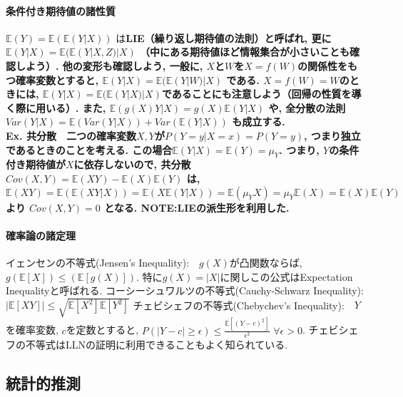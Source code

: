 \documentclass[paper=a4paper,fontsize=10pt]{jlreq}
\begin{document}
\paragraph{条件付き期待値の諸性質}
$\mathbb{E}(Y)=\mathbb{E}(\mathbb{E}(Y|X))$ は\rmfamily\mcfamily\bfseries{LIE（繰り返し期待値の法則）}\mdseries と呼ばれ, 更に $\mathbb{E}(Y|X)=\mathbb{E}(\mathbb{E}(Y|X, Z)|X)$ （中にある期待値ほど情報集合が小さいことも確認しよう）. 他の変形も確認しよう, 一般に, $X$と$W$を$X=f(W)$の関係性をもつ確率変数とすると, $\mathbb{E}(Y|X)=\mathbb{E}(\mathbb{E}(Y|W)|X)$ である. $X=f(W)=W$のときには, $\mathbb{E}(Y|X)=\mathbb{E}(\mathbb{E}(Y|X)|X)$であることにも注意しよう（回帰の性質を導く際に用いる）. また, $\mathbb{E}(g(X)Y|X)=g(X)\mathbb{E}(Y|X)$ や, 全分散の法則 $Var(Y|X)=\mathbb{E}(Var(Y|X))+Var(\mathbb{E}(Y|X))$ も成立する.\\

\rmfamily\mcfamily\bfseries{Ex. 共分散}\mdseries　二つの確率変数$X,Y$が$P(Y=y|X=x)=P(Y=y)$, つまり独立であるときのことを考える. この場合$\mathbb{E}(Y|X)=\mathbb{E}(Y)=\mu_Y$. つまり, $Y$の条件付き期待値が$X$に依存しないので, 共分散$Cov(X, Y)=\mathbb{E}(XY)-\mathbb{E}(X)\mathbb{E}(Y)$ は, $\mathbb{E}(XY)=\mathbb{E}(\mathbb{E}(XY|X))=\mathbb{E}(X\mathbb{E}(Y|X))=\mathbb{E}(\mu_Y X)=\mu_Y\mathbb{E}(X)=\mathbb{E}(X)\mathbb{E}(Y)$ より $Cov(X, Y)=0$ となる. \rmfamily\mcfamily\bfseries{NOTE}\mdseries :LIEの派生形を利用した.\\

\paragraph{確率論の諸定理}
イェンセンの不等式(Jensen's Inequality):　$g(X)$が凸関数ならば, $g(\mathbb{E}[X]) \leq (\mathbb{E}[g(X)])$. 特に$g(X)=\left\lvert X \right\rvert $に関しこの公式はExpectation Inequalityと呼ばれる. コーシーシュワルツの不等式(Cauchy-Schwarz Inequality):　$ \left\lvert \mathbb{E}[XY] \right\rvert \leq \sqrt{\mathbb{E}{[X^2]}\mathbb{E}{[Y^2]}}$ チェビシェフの不等式(Chebychev's Inequality):　$Y$を確率変数, $c$を定数とすると, $P(|Y-c|\geq\epsilon)\leq\frac{\mathbb{E}[(Y-c)^2]}{\epsilon^2}$ $\forall\epsilon>0$. チェビシェフの不等式はLLNの証明に利用できることもよく知られている. \\

\subsection{統計的推測}
\end{document}
